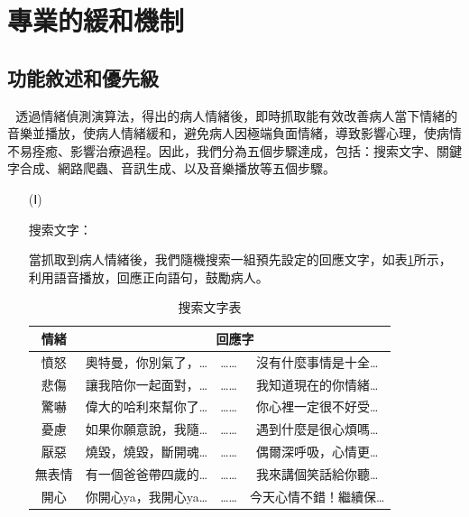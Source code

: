 \documentclass[12pt]{scrreprt}
\begin{document}
\section{專業的緩和機制}

\subsection{功能敘述和優先級}

$~~~$透過情緒偵測演算法，得出的病人情緒後，即時抓取能有效改善病人當下情緒的音樂並播放，使病人情緒緩和，避免病人因極端負面情緒，導致影響心理，使病情不易痊癒、影響治療過程。因此，我們分為五個步驟達成，包括：搜索文字、關鍵字合成、網路爬蟲、音訊生成、以及音樂播放等五個步驟。\\

\begin{itemize}
\item[(Ⅰ)]{\begin{bfseries}{搜索文字：}\end{bfseries}}

當抓取到病人情緒後，我們隨機搜索一組預先設定的回應文字，如表\ref{lab:searchtext}所示，利用語音播放，回應正向語句，鼓勵病人。\\

\renewcommand{\arraystretch}{1.2} 
\renewcommand{\multirowsetup}{\centering}

\begin{table}[h]
\caption{搜索文字表}
    \centering
\begin{tabular}{|*{4}{r|}}
\hline
\multicolumn{1}{|c|}{情緒}
& \multicolumn{3}{c|}{回應字} \\\hline
\multicolumn{1}{|c}{憤怒}&\multicolumn{1}{|c}{奧特曼，你別氣了，…}&\multicolumn{1}{|c}{……}&\multicolumn{1}{|c|}{沒有什麼事情是十全…} \\\hline
\multicolumn{1}{|c}{悲傷}&\multicolumn{1}{|c}{讓我陪你一起面對，…}&\multicolumn{1}{|c}{……}&\multicolumn{1}{|c|}{我知道現在的你情緒…} \\\hline
\multicolumn{1}{|c}{驚嚇}&\multicolumn{1}{|c}{偉大的哈利來幫你了…}&\multicolumn{1}{|c}{……}&\multicolumn{1}{|c|}{你心裡一定很不好受…}\\\hline
\multicolumn{1}{|c}{憂慮}&\multicolumn{1}{|c}{如果你願意說，我隨…}&\multicolumn{1}{|c}{……}&\multicolumn{1}{|c|}{遇到什麼是很心煩嗎…}\\\hline
\multicolumn{1}{|c}{厭惡}&\multicolumn{1}{|c}{燒毀，燒毀，斷開魂…}   &\multicolumn{1}{|c}{……}   &\multicolumn{1}{|c|}{偶爾深呼吸，心情更… }\\\hline
\multicolumn{1}{|c}{無表情}&\multicolumn{1}{|c}{有一個爸爸帶四歲的…}   &\multicolumn{1}{|c}{……}   &\multicolumn{1}{|c|}{我來講個笑話給你聽…}\\\hline
\multicolumn{1}{|c}{開心}&\multicolumn{1}{|c}{你開心ya，我開心ya…}   &\multicolumn{1}{|c}{……}   &\multicolumn{1}{|c|}{今天心情不錯！繼續保…}\\\hline
\end{tabular}
\label{lab:searchtext}
\end{table}


\end{itemize}
\end{document}
